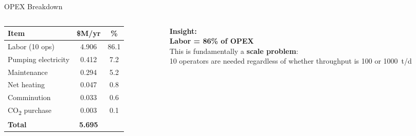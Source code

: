 \documentclass[aspectratio=169]{beamer}
\begin{document}
\begin{frame}{OPEX Breakdown}

\begin{columns}[T]
\begin{column}{0.55\textwidth}
\begin{table}
\centering\small
\begin{tabular}{lcc}
\toprule
\textbf{Item} & \textbf{\$M/yr} & \textbf{\%} \\
\midrule
\textcolor{cost}{Labor (10 ops)} & \textcolor{cost}{4.906} & \textcolor{cost}{86.1} \\
Pumping electricity & 0.412 & 7.2 \\
Maintenance & 0.294 & 5.2 \\
Net heating & 0.047 & 0.8 \\
Comminution & 0.033 & 0.6 \\
CO\textsubscript{2} purchase & 0.003 & 0.1 \\
\midrule
\textbf{Total} & \textbf{5.695} & \\
\bottomrule
\end{tabular}
\end{table}
\end{column}
\begin{column}{0.42\textwidth}
\textbf{Insight:}\\[6pt]
\textcolor{StepRed}{\textbf{Labor = 86\% of OPEX}}\\[6pt]
This is fundamentally a \textbf{scale problem}:\\
10 operators are needed regardless of whether throughput is 100 or \SI{1000}{t/d}
\end{column}
\end{columns}
\end{frame}
\end{document}
